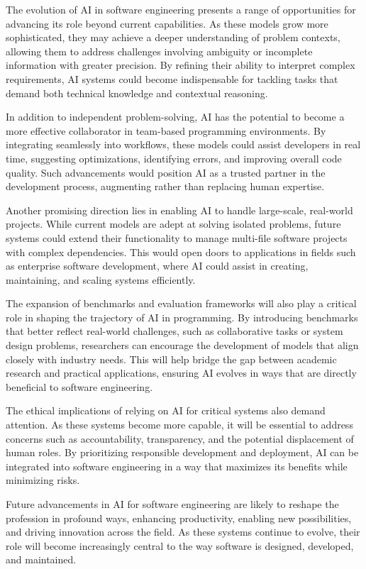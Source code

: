 The evolution of AI in software engineering presents a range of opportunities for advancing its role beyond current capabilities. As these models grow more sophisticated, they may achieve a deeper understanding of problem contexts, allowing them to address challenges involving ambiguity or incomplete information with greater precision. By refining their ability to interpret complex requirements, AI systems could become indispensable for tackling tasks that demand both technical knowledge and contextual reasoning.

In addition to independent problem-solving, AI has the potential to become a more effective collaborator in team-based programming environments. By integrating seamlessly into workflows, these models could assist developers in real time, suggesting optimizations, identifying errors, and improving overall code quality. Such advancements would position AI as a trusted partner in the development process, augmenting rather than replacing human expertise.

Another promising direction lies in enabling AI to handle large-scale, real-world projects. While current models are adept at solving isolated problems, future systems could extend their functionality to manage multi-file software projects with complex dependencies. This would open doors to applications in fields such as enterprise software development, where AI could assist in creating, maintaining, and scaling systems efficiently.

The expansion of benchmarks and evaluation frameworks will also play a critical role in shaping the trajectory of AI in programming. By introducing benchmarks that better reflect real-world challenges, such as collaborative tasks or system design problems, researchers can encourage the development of models that align closely with industry needs. This will help bridge the gap between academic research and practical applications, ensuring AI evolves in ways that are directly beneficial to software engineering.

The ethical implications of relying on AI for critical systems also demand attention. As these systems become more capable, it will be essential to address concerns such as accountability, transparency, and the potential displacement of human roles. By prioritizing responsible development and deployment, AI can be integrated into software engineering in a way that maximizes its benefits while minimizing risks.

Future advancements in AI for software engineering are likely to reshape the profession in profound ways, enhancing productivity, enabling new possibilities, and driving innovation across the field. As these systems continue to evolve, their role will become increasingly central to the way software is designed, developed, and maintained.








